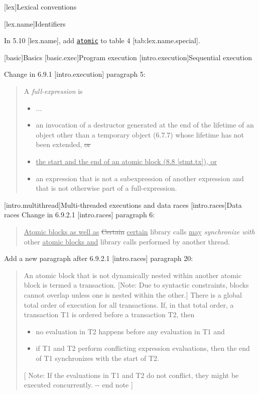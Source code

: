 \setcounter{section}{9}
[lex]{Lexical conventions}


[lex.name]{Identifiers}

\pnum
In 5.10 {[}lex.name{]}, add \uline{\texttt{atomic}} to table 4
{[}tab:lex.name.special{]}.

[basic]{Basics}
[basic.exec]{Program execution}
[intro.execution]{Sequential execution}

\pnum
Change in 6.9.1 {[}intro.execution{]} paragraph 5:

\begin{quote}
A \emph{full-expression} is

\begin{itemize}
\tightlist
\item
  ...
\item
  an invocation of a destructor generated at the end of the lifetime of
  an object other than a temporary object (6.7.7) whose lifetime has not
  been extended, \sout{or}
\item
  \uline{the start and the end of an atomic block (8.8 {[}stmt.tx{]}),
  or}
\item
  an expression that is not a subexpression of another expression and
  that is not otherwise part of a full-expression.
\end{itemize}
\end{quote}

[intro.multithread]{Multi-threaded executions and data races}
[intro.races]{Data races} 
\pnum
Change in 6.9.2.1 {[}intro.races{]} paragraph 6:

\begin{quote}
\uline{Atomic blocks as well as} \sout{Certain} \uline{certain} library
calls \uline{may} \emph{synchronize with} other \uline{atomic blocks
and} library calls performed by another thread.
\end{quote}

\pnum
Add a new paragraph after 6.9.2.1 {[}intro.races{]} paragraph 20:

\begin{quote}
An atomic block that is not dynamically nested within another atomic
block is termed a transaction. {[}Note: Due to syntactic constraints,
blocks cannot overlap unless one is nested within the other.{]} There is
a global total order of execution for all transactions. If, in that
total order, a transaction T1 is ordered before a transaction T2, then

\begin{itemize}
\tightlist
\item
  no evaluation in T2 happens before any evaluation in T1 and
\item
  if T1 and T2 perform conflicting expression evaluations, then the end
  of T1 synchronizes with the start of T2.
\end{itemize}

{[} Note: If the evaluations in T1 and T2 do not conflict, they might be
executed concurrently. -\/- end note {]}
\end{quote}

